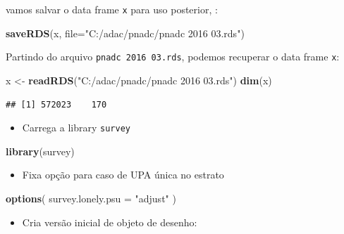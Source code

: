 \documentclass[]{book}
\newenvironment{Shaded}{\begin{snugshade}}{\end{snugshade}}
\newcommand{\KeywordTok}[1]{\textcolor[rgb]{0.13,0.29,0.53}{\textbf{{#1}}}}
\newcommand{\DataTypeTok}[1]{\textcolor[rgb]{0.13,0.29,0.53}{{#1}}}
\newcommand{\StringTok}[1]{\textcolor[rgb]{0.31,0.60,0.02}{{#1}}}
\newcommand{\NormalTok}[1]{{#1}}
\providecommand{\tightlist}{%
  \setlength{\itemsep}{0pt}\setlength{\parskip}{0pt}}
\numberwithin{example}{chapter}
\numberwithin{remark}{chapter}
\numberwithin{definition}{chapter}
\begin{document}
vamos salvar o data frame \texttt{x} para uso posterior, :

\begin{Shaded}
\begin{Highlighting}[]
\KeywordTok{saveRDS}\NormalTok{(x, }\DataTypeTok{file=}\StringTok{"C:/adac/pnadc/pnadc 2016 03.rds"}\NormalTok{)}
\end{Highlighting}
\end{Shaded}

Partindo do arquivo \texttt{pnadc\ 2016\ 03.rds}, podemos recuperar o
data frame \texttt{x}:

\begin{Shaded}
\begin{Highlighting}[]
\NormalTok{x <-}\StringTok{ }\KeywordTok{readRDS}\NormalTok{(}\StringTok{"C:/adac/pnadc/pnadc 2016 03.rds"}\NormalTok{)}
\KeywordTok{dim}\NormalTok{(x)}
\end{Highlighting}
\end{Shaded}

\begin{verbatim}
## [1] 572023    170
\end{verbatim}

\begin{itemize}
\tightlist
\item
  Carrega a library \texttt{survey}
\end{itemize}

\begin{Shaded}
\begin{Highlighting}[]
\KeywordTok{library}\NormalTok{(survey)}
\end{Highlighting}
\end{Shaded}

\begin{itemize}
\tightlist
\item
  Fixa opção para caso de UPA única no estrato
\end{itemize}

\begin{Shaded}
\begin{Highlighting}[]
\KeywordTok{options}\NormalTok{( }\DataTypeTok{survey.lonely.psu =} \StringTok{"adjust"} \NormalTok{)}
\end{Highlighting}
\end{Shaded}

\begin{itemize}
\tightlist
\item
  Cria versão inicial de objeto de desenho:
\end{itemize}
\end{document}
